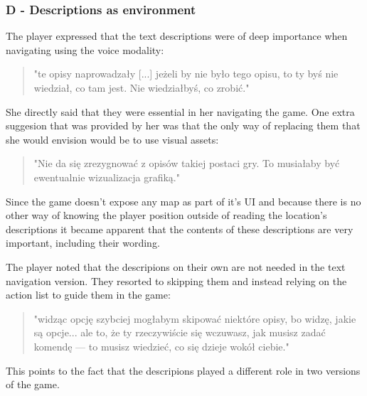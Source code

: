 \subsubsection{D - Descriptions as environment}


The player expressed that the text descriptions were of deep importance when navigating using the voice modality:
\begin{quote}
    "te opisy naprowadzały [...] jeżeli by nie było tego opisu, to ty byś nie wiedział, co tam jest. Nie wiedziałbyś, co zrobić."
\end{quote}

She directly said that they were essential in her navigating the game. One extra suggesion that was provided by her was that the only way of replacing them that she would envision would be to use visual assets:
\begin{quote}
    "Nie da się zrezygnować z opisów takiej postaci gry. To musiałaby być ewentualnie wizualizacja grafiką."
\end{quote}

Since the game doesn't expose any map as part of it's UI and because there is no other way of knowing the player position outside of reading the location's descriptions it became apparent that the contents of these descriptions are very important, including their wording. 


The player noted that the descripions on their own are not needed in the text navigation version. They resorted to skipping them and instead relying on the action list to guide them in the game:

\begin{quote}
    "widząc opcję szybciej mogłabym skipować niektóre opisy, bo widzę, jakie są opcje... ale to, że ty rzeczywiście się wczuwasz, jak musisz zadać komendę — to musisz wiedzieć, co się dzieje wokół ciebie."
\end{quote}

This points to the fact that the descripions played a different role in two versions of the game.






